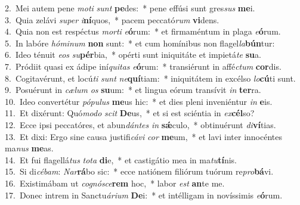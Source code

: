 {2.~}Mei autem pene \textit{mo}\textit{ti} \textit{sunt} \textbf{pe}des:~* pene effúsi sunt gres\textit{sus} \textbf{me}i.\\
{3.~}Quia zelávi \textit{su}\textit{per} \textit{i}\textbf{ní}quos,~* pacem peccató\textit{rum} \textbf{vi}dens.\\
{4.~}Quia non est respéctus \textit{mor}\textit{ti} \textit{e}\textbf{ó}rum:~* et firmaméntum in plaga \textit{e}\textbf{ó}rum.\\
{5.~}In labóre \textit{hó}\textit{mi}\textit{num} \textbf{non} sunt:~* et cum homínibus non flagel\textit{la}\textbf{bún}tur:\\
{6.~}Ideo ténuit \textit{e}\textit{os} \textit{su}\textbf{pér}bia,~* opérti sunt iniquitáte et impietá\textit{te} \textbf{su}a.\\
{7.~}Pródiit quasi ex ádipe iní\textit{qui}\textit{tas} \textit{e}\textbf{ó}rum:~* transiérunt in affé\textit{ctum} \textbf{cor}dis.\\
{8.~}Cogitavérunt, et locú\textit{ti} \textit{sunt} \textit{ne}\textbf{quí}tiam:~* iniquitátem in excélso \textit{lo}\textbf{cú}ti sunt.\\
{9.~}Posuérunt in \textit{cæ}\textit{lum} \textit{os} \textbf{su}um:~* et lingua eórum transívit \textit{in} \textbf{ter}ra.\\
{10.~}Ideo convertétur \textit{pó}\textit{pu}\textit{lus} \textbf{me}us hic:~* et dies pleni inveniéntur \textit{in} \textbf{e}is.\\
{11.~}Et dixérunt: Quó\textit{mo}\textit{do} \textit{scit} \textbf{De}us,~* et si est sciéntia in \textit{ex}\textbf{cél}so?\\
{12.~}Ecce ipsi peccatóres, et abun\textit{dán}\textit{tes} \textit{in} \textbf{sǽ}culo,~* obtinuérunt \textit{di}\textbf{ví}tias.\\
{13.~}Et dixi: Ergo sine causa justifi\textit{cá}\textit{vi} \textit{cor} \textbf{me}um,~* et lavi inter innocéntes ma\textit{nus} \textbf{me}as.\\
{14.~}Et fui flagellá\textit{tus} \textit{to}\textit{ta} \textbf{di}e,~* et castigátio mea in ma\textit{tu}\textbf{tí}nis.\\
{15.~}Si di\textit{cé}\textit{bam}: \textit{Nar}\textbf{rá}bo sic:~* ecce natiónem filiórum tuórum re\textit{pro}\textbf{bá}vi.\\
{16.~}Existimábam ut \textit{co}\textit{gnó}\textit{sce}\textbf{rem} hoc,~* labor \textit{est} \textbf{an}te me.\\
{17.~}Donec intrem in Sanctu\textit{á}\textit{ri}\textit{um} \textbf{De}i:~* et intélligam in novíssimis \textit{e}\textbf{ó}rum.\\
